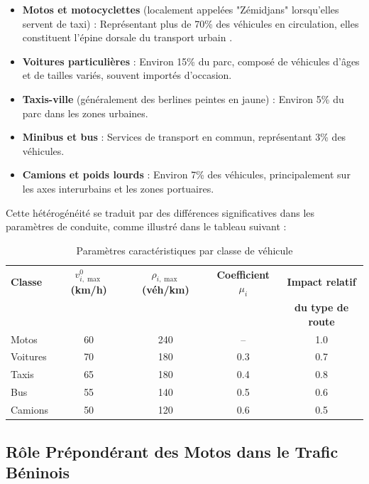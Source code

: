 \begin{itemize}
\item \textbf{Motos et motocyclettes} (localement appelées "Zémidjans" lorsqu'elles servent de taxi) : Représentant plus de 70\% des véhicules en circulation, elles constituent l'épine dorsale du transport urbain \cite{aerc2019taxi}.

\item \textbf{Voitures particulières} : Environ 15\% du parc, composé de véhicules d'âges et de tailles variés, souvent importés d'occasion.

\item \textbf{Taxis-ville} (généralement des berlines peintes en jaune) : Environ 5\% du parc dans les zones urbaines.

\item \textbf{Minibus et bus} : Services de transport en commun, représentant 3\% des véhicules.

\item \textbf{Camions et poids lourds} : Environ 7\% des véhicules, principalement sur les axes interurbains et les zones portuaires.
\end{itemize}

Cette hétérogénéité se traduit par des différences significatives dans les paramètres de conduite, comme illustré dans le tableau suivant :

\begin{table}[htbp]
\centering
\caption{Paramètres caractéristiques par classe de véhicule}
\label{tab:parametres_vehicules}
\begin{tabular}{lcccc}
\toprule
\textbf{Classe} & \textbf{$v_{i,\max}^0$ (km/h)} & \textbf{$\rho_{i,\max}$ (véh/km)} & \textbf{Coefficient $\mu_i$} & \textbf{Impact relatif} \\
 & & & & \textbf{du type de route} \\
\midrule
Motos & 60 & 240 & -- & 1.0 \\
Voitures & 70 & 180 & 0.3 & 0.7 \\
Taxis & 65 & 180 & 0.4 & 0.8 \\
Bus & 55 & 140 & 0.5 & 0.6 \\
Camions & 50 & 120 & 0.6 & 0.5 \\
\bottomrule
\end{tabular}
\end{table}

\subsection{Rôle Prépondérant des Motos dans le Trafic Béninois}
\label{subsec:role_motos}

